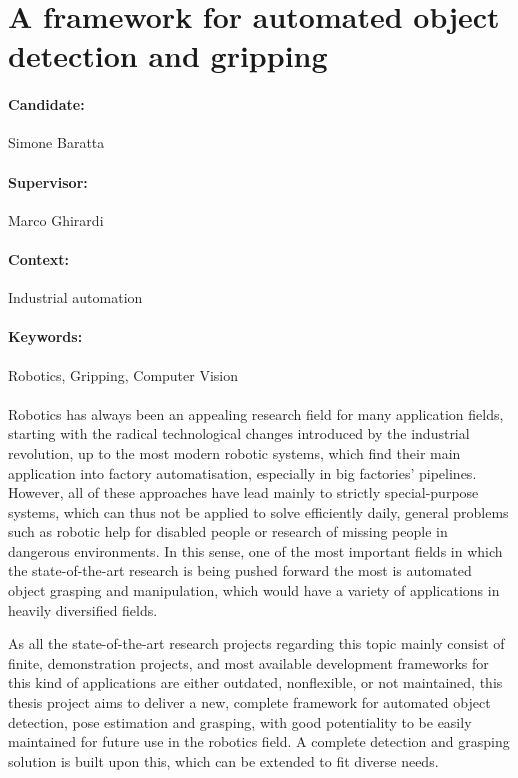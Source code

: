 \documentclass[a4paper,11pt]{article}
\begin{document}
\section*{A framework for automated object detection and gripping}
\paragraph{Candidate:} Simone Baratta
\paragraph{Supervisor:} Marco Ghirardi
\paragraph{Context:} Industrial automation
\paragraph{Keywords:} Robotics, Gripping, Computer Vision
\paragraph{}
Robotics has always been an appealing research field for many
application fields, starting with the radical technological changes
introduced by the industrial revolution, up to the most modern
robotic systems, which find their main application into factory
automatisation, especially in big factories' pipelines. However, all
of these approaches have lead mainly to strictly special-purpose
systems, which can thus not be applied to solve efficiently daily, general problems such as
robotic help for disabled people or research of missing people in
dangerous environments. In this sense, one of the most important
fields in which the state-of-the-art research is being pushed forward
the most is automated object grasping and manipulation, which would have
a variety of applications in heavily diversified fields.

As all the state-of-the-art research projects regarding this topic  mainly
consist of finite, demonstration projects, and most available
development frameworks for this kind of applications are either
outdated, nonflexible, or not maintained, this thesis project aims to
deliver a new, complete framework for automated object detection, pose
estimation and grasping, with good potentiality to be easily maintained for
future use in the robotics field. A complete detection and grasping solution is
built upon this, which can be extended to fit diverse needs.
\end{document}
